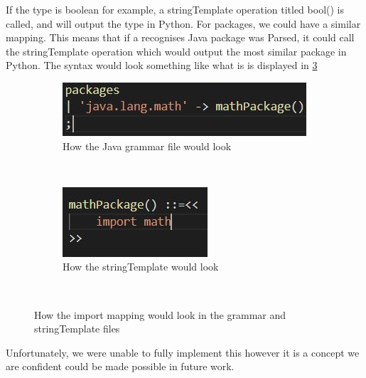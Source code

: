 \documentclass{l4proj}
\begin{document}
If the type is boolean for example, a stringTemplate operation titled bool() is called, and will output the type in Python. For packages, we could have a similar mapping. This means that if a recognises Java package was Parsed, it could call the stringTemplate operation which would output the most similar package in Python. The syntax would look something like what is is displayed in \ref{fig:imports}
\begin{figure}[htb] 
    \centering
    \begin{subfigure}[b]{0.45\textwidth}
        \includegraphics[width=\textwidth]{images/importGrammar.JPG}
        \caption{How the Java grammar file would look}
        \label{fig:importGrammar}
    \end{subfigure}
    ~ %
    \begin{subfigure}[b]{0.45\textwidth}
        \includegraphics[width=\textwidth]{images/importTemplate.JPG}
        \caption{How the stringTemplate would look}
        \label{fig:importTemplate}
    \end{subfigure}
    ~ %
    \caption{How the import mapping would look in the grammar and stringTemplate files
    }\label{fig:imports}
\end{figure}

Unfortunately, we were unable to fully implement this however it is a concept we are confident could be made possible in future work.
\end{document}
